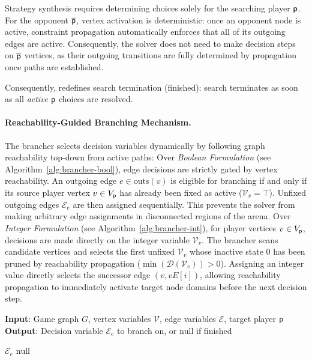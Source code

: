 \documentclass[a4paper,fleqn]{cas-sc}
\begin{document}
Strategy synthesis requires determining choices solely for the searching player $\mathsf{p}$. For the opponent $\overline{\mathsf{p}}$, vertex activation is deterministic: once an opponent node is active, constraint propagation automatically enforces that all of its outgoing edges are active. Consequently, the solver does not need to make decision steps on $\overline{\mathsf{p}}$ vertices, as their outgoing transitions are fully determined by propagation once paths are established.

Consequently, \nocbrancher redefines search termination (\textsf{finished}): search terminates as soon as all \emph{active} $\mathsf{p}$ choices are resolved.

\paragraph{Reachability-Guided Branching Mechanism.}
The brancher selects decision variables dynamically by following graph reachability top-down from active paths: 
%
Over \textit{Boolean Formulation} (see Algorithm~\ref{alg:brancher-bool}), edge decisions are strictly gated by vertex reachability. An outgoing edge $e \in \text{outs}(v)$ is eligible for branching if and only if its source player vertex $v \in V_{\mathsf{p}}$ has already been fixed as active ($\mathcal{V}_v = \top$). Unfixed outgoing edges $\mathcal{E}_e$ are then assigned sequentially. This prevents the solver from making arbitrary edge assignments in disconnected regions of the arena.
%
Over \textit{Integer Formulation} (see Algorithm~\ref{alg:brancher-int}), for player vertices $v \in V_{\mathsf{p}}$, decisions are made directly on the integer variable $\mathcal{V}_v$. The brancher scans candidate vertices and selects the first unfixed $\mathcal{V}_v$ whose inactive state $0$ has been pruned by reachability propagation ($\min(\mathcal{D}(\mathcal{V}_v)) > 0$). Assigning an integer value directly selects the successor edge $(v, vE[i])$, allowing reachability propagation to immediately activate target node domains before the next decision step.

\begin{algorithm}[htb]
\small
\caption{\textbf{\textit{NOCBrancherBool}}}
\textbf{Input}: Game graph $G$, vertex variables $\mathcal{V}$, edge variables $\mathcal{E}$, target player $\mathsf{p}$ \\
\textbf{Output}: Decision variable $\mathcal{E}_e$ to branch on, or $\text{null}$ if finished
\begin{algorithmic}[1]
                    \RETURN $\mathcal{E}_e$
                \ENDIF
            \ENDFOR
        \ENDIF
    \ENDFOR
    \RETURN $\text{null}$
\end{algorithmic}
\label{alg:brancher-bool}
\end{algorithm}
\end{document}
